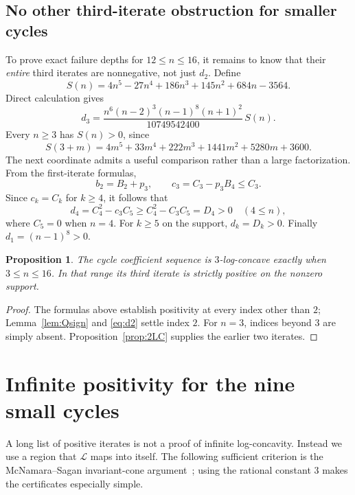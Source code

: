 \documentclass[11pt,a4paper]{article}
\newtheorem{proposition}[theorem]{Proposition}
\theoremstyle{definition}
\newcommand{\Lop}{\mathcal L}
\begin{document}
\subsection{No other third-iterate obstruction for smaller cycles}
To prove exact failure depths for $12\le n\le16$, it remains to know
that their \emph{entire} third iterates are nonnegative, not just $d_2$.
Define
\[
 S(n)=4n^5-27n^4+186n^3+145n^2+684n-3564.
\]
Direct calculation gives
\begin{equation}\label{eq:d3}
 d_3=\frac{n^6(n-2)^3(n-1)^8(n+1)^2}{10749542400}\,S(n).
\end{equation}
Every $n\ge3$ has $S(n)>0$, since
\begin{equation}\label{eq:Sshift}
 S(3+m)=4m^5+33m^4+222m^3+1441m^2+5280m+3600.
\end{equation}
The next coordinate admits a useful comparison rather than a large
factorization. From the first-iterate formulas,
\[
  b_2=B_2+p_3,
  \qquad c_3=C_3-p_3B_4\le C_3.
\]
Since $c_k=C_k$ for $k\ge4$, it follows that
\begin{equation}\label{eq:d4compare}
 d_4=C_4^2-c_3C_5\ge C_4^2-C_3C_5=D_4>0
 \quad(4\le n),
\end{equation}
where $C_5=0$ when $n=4$. For $k\ge5$ on the support, $d_k=D_k>0$.
Finally $d_1=(n-1)^8>0$.

\begin{proposition}\label{prop:3LC}
The cycle coefficient sequence is $3$-log-concave exactly when
$3\le n\le16$. In that range its third iterate is strictly positive
on the nonzero support.
\end{proposition}
\begin{proof}
The formulas above establish positivity at every index other than $2$;
Lemma~\ref{lem:Qsign} and \eqref{eq:d2} settle index $2$. For $n=3$,
indices beyond $3$ are simply absent. Proposition~\ref{prop:2LC} supplies
the earlier two iterates.
\end{proof}

\section{Infinite positivity for the nine small cycles}\label{sec:cone}

A long list of positive iterates is not a proof of infinite
log-concavity. Instead we use a region that $\Lop$ maps into itself.
The following sufficient criterion is the McNamara--Sagan
invariant-cone argument~\cite[Lemma~2.1]{MS}; using the rational constant
$3$ makes the certificates especially simple.
\end{document}
